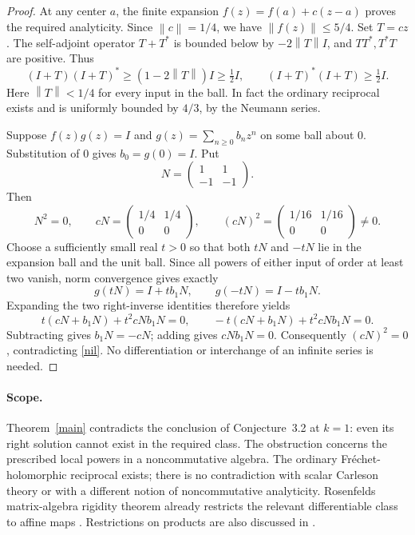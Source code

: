 \documentclass[11pt]{article}
\newcommand{\norm}[1]{\left\lVert#1\right\rVert}
\begin{document}
\begin{proof}
At any center $a$, the finite expansion $f(z)=f(a)+c(z-a)$ proves the
required analyticity. Since $\norm c=1/4$, we have $\norm{f(z)}\leq5/4$.
Set $T=cz$. The self-adjoint operator $T+T^*$ is bounded below by
$-2\norm T I$, and $TT^*,T^*T$ are positive. Thus
\[
 (I+T)(I+T)^*\geq(1-2\norm T)I\geq\tfrac12I,
 \qquad (I+T)^*(I+T)\geq\tfrac12I.
\]
Here $\norm T<1/4$ for every input in the ball. In fact the ordinary
reciprocal exists and is uniformly bounded by $4/3$, by the Neumann series.

Suppose $f(z)g(z)=I$ and $g(z)=\sum_{n\geq0}b_nz^n$ on some ball about
$0$. Substitution of $0$ gives $b_0=g(0)=I$. Put
\[
 N=\begin{pmatrix}1&1\\-1&-1\end{pmatrix}.
\]
Then
\begin{equation}\label{nil}
 N^2=0,\qquad
 cN=\begin{pmatrix}1/4&1/4\\0&0\end{pmatrix},\qquad
 (cN)^2=\begin{pmatrix}1/16&1/16\\0&0\end{pmatrix}\ne0.
\end{equation}
Choose a sufficiently small real $t>0$ so that both $tN$ and $-tN$ lie
in the expansion ball and the unit ball. Since all powers of either input
of order at least two vanish, norm convergence gives exactly
\[
 g(tN)=I+tb_1N,\qquad g(-tN)=I-tb_1N.
\]
Expanding the two right-inverse identities therefore yields
\[
 t(cN+b_1N)+t^2cNb_1N=0,\qquad
 -t(cN+b_1N)+t^2cNb_1N=0.
\]
Subtracting gives $b_1N=-cN$; adding gives $cNb_1N=0$.
Consequently $(cN)^2=0$, contradicting \eqref{nil}.
No differentiation or interchange of an infinite series is needed.
\end{proof}

\paragraph{Scope.}
Theorem~\ref{main} contradicts the conclusion of Conjecture~3.2 at $k=1$:
even its right solution cannot exist in the required class. The obstruction
concerns the prescribed local powers in a noncommutative algebra. The
ordinary Fr\'echet-holomorphic reciprocal exists; there is no contradiction
with scalar Carleson theory or with a different notion of noncommutative
analyticity. Rosenfeld\textquotesingle s matrix-algebra rigidity theorem already restricts
the relevant differentiable class to affine maps \cite[Theorem~2]{Rosenfeld}.
Restrictions on products are also discussed in \cite[Theorem~5.10]{Cook}.
\end{document}
